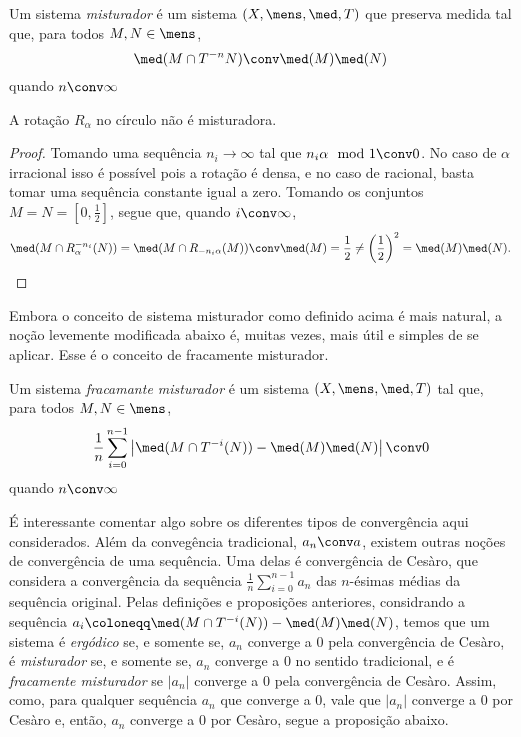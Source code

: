 \begin{definition}
	Um sistema \emph{misturador} é um sistema $(X,\mens,\med,T)$ que preserva medida tal que, para todos $M,N \in \mens$,
	\begin{equation*}
	\med(M \cap T^{-n} N) \conv \med(M)\med(N)
	\end{equation*}
quando $n \conv \infty$
\end{definition}

\begin{proposition}
	A rotação $R_\alpha$ no círculo não é misturadora.
\end{proposition}
\begin{proof}
	Tomando uma sequência $n_i \to \infty$ tal que $n_i\alpha \mod 1 \conv 0$. No caso de $\alpha$ irracional isso é possível pois a rotação é densa, e no caso de racional, basta tomar uma sequência constante igual a zero. Tomando os conjuntos $M=N=[0,\frac{1}{2}]$, segue que, quando $i \conv \infty$,
	\begin{equation*}
	\med(M \cap R_\alpha^{-n_i}(N))=\med(M \cap R_{-n_i\alpha}(M)) \conv \med(M)=\frac{1}{2}\neq \left(\frac{1}{2}\right)^2=\med(M)\med(N).
	\end{equation*}
\end{proof}

	Embora o conceito de sistema misturador como definido acima é mais natural, a noção levemente modificada abaixo é, muitas vezes, mais útil e simples de se aplicar. Esse é o conceito de fracamente misturador.

\begin{definition}
	Um sistema \emph{fracamante misturador} é um sistema $(X,\mens,\med,T)$ tal que, para todos $M,N \in \mens$,
	\begin{equation*}
	\frac{1}{n} \sum_{i=0}^{n-1} \left|\med(M \cap T^{-i}(N)) - \med(M)\med(N)\right| \conv 0
	\end{equation*}
quando $n \conv \infty$
\end{definition}

	É interessante comentar algo sobre os diferentes tipos de convergência aqui considerados. Além da convegência tradicional, $a_n \conv a$, existem outras noções de convergência de uma sequência. Uma delas é convergência de Cesàro, que considera a convergência da sequência $\frac{1}{n} \sum_{i=0}^{n-1} a_n$ das $n$-ésimas médias da sequência original. Pelas definições e proposições anteriores, considrando a sequência $a_i\coloneqq\med(M \cap T^{-i}(N)) - \med(M)\med(N)$, temos que um sistema é \emph{ergódico} se, e somente se, $a_n$ converge a $0$ pela convergência de Cesàro, é \emph{misturador} se, e somente se, $a_n$ converge a $0$ no sentido tradicional, e é \emph{fracamente misturador} se $|a_n|$ converge a $0$ pela convergência de Cesàro. Assim, como, para qualquer sequência $a_n$ que converge a $0$, vale que $|a_n|$ converge a $0$ por Cesàro e, então, $a_n$ converge a $0$ por Cesàro, segue a proposição abaixo.

